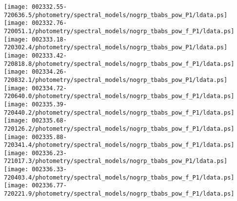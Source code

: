 \documentclass{aastex}
\begin{document}
\begin{figure*}[!ht]
\centering
\texttt{[image: 002332.55-720636.5/photometry/spectral\_models/nogrp\_tbabs\_pow\_P1/ldata.ps]} \hfill 
\texttt{[image: 002332.76-720051.1/photometry/spectral\_models/nogrp\_tbabs\_pow\_f\_P1/ldata.ps]} \hfill 
\texttt{[image: 002333.18-720302.4/photometry/spectral\_models/nogrp\_tbabs\_pow\_P1/ldata.ps]} \\ 
\vspace*{0.5in}
\texttt{[image: 002333.42-720818.8/photometry/spectral\_models/nogrp\_tbabs\_pow\_f\_P1/ldata.ps]} \hfill 
\texttt{[image: 002334.26-720832.1/photometry/spectral\_models/nogrp\_tbabs\_pow\_P1/ldata.ps]} \hfill 
\texttt{[image: 002334.72-720640.0/photometry/spectral\_models/nogrp\_tbabs\_pow\_f\_P1/ldata.ps]} \\ 
\vspace*{0.5in}
\texttt{[image: 002335.39-720440.2/photometry/spectral\_models/nogrp\_tbabs\_pow\_f\_P1/ldata.ps]} \hfill 
\texttt{[image: 002335.68-720126.2/photometry/spectral\_models/nogrp\_tbabs\_pow\_f\_P1/ldata.ps]} \hfill 
\texttt{[image: 002335.88-720341.4/photometry/spectral\_models/nogrp\_tbabs\_pow\_f\_P1/ldata.ps]} \\ 
\vspace*{0.5in}
\texttt{[image: 002336.23-721017.3/photometry/spectral\_models/nogrp\_tbabs\_pow\_P1/ldata.ps]} \hfill 
\texttt{[image: 002336.33-720403.4/photometry/spectral\_models/nogrp\_tbabs\_pow\_f\_P1/ldata.ps]} \hfill 
\texttt{[image: 002336.77-720221.9/photometry/spectral\_models/nogrp\_tbabs\_pow\_f\_P1/ldata.ps]} \\ 
\vspace*{0.5in}
\end{figure*}
\clearpage
\end{document}
